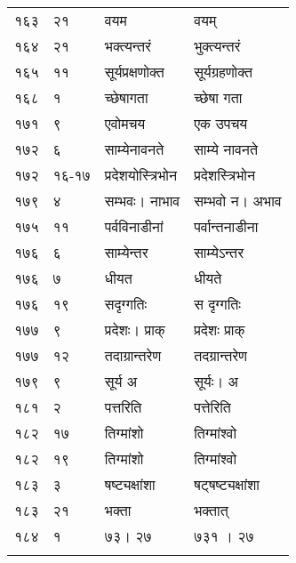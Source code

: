\documentclass[11pt, openany]{book}
\begin{document}
\begin{longtable}{p{1cm} p{1.5cm} p{4cm} p{4cm}}
 १६३ & २१ & वयम & वयम् \\

 १६४ & २१ & भक्त्यन्तरं & भुक्त्यन्तरं \\

 १६५ & ११ & सूर्यप्रक्षणोक्त & सूर्यग्रहणोक्त \\

 १६८ & १ & च्छेषागता & च्छेषा गता \\

 १७१ & ९ & एवोमचय & एक उपचय \\

 १७२ & ६ & साम्येनावनते & साम्ये नावनते \\

 १७२ & १६-१७ & प्रदेशयोस्त्रिभोन & प्रदेशस्त्रिभोन \\

 १७९ & ४ & सम्भवः। नाभाव & सम्भवो न। अभाव \\

 १७५ & ११ & पर्वविनाडीनां & पर्वान्तनाडीना \\

 १७६ & ६ & साम्येन्तर & साम्येऽन्तर \\

 १७६ & ७ & धीयत & धीयते \\

 १७६ & १९ & सदृग्गतिः & स दृग्गतिः \\

 १७७ & ९ & प्रदेशः। प्राक् & प्रदेशः प्राक् \\

 १७७ & १२ & तदाग्रान्तरेण & तदग्रान्तरेण \\

 १७९ & ९ & सूर्य अ &  सूर्यः। अ \\

 १८१ & २ & पत्तरिति & पत्तेरिति \\

 १८२ & १७ & तिग्मांशो & तिग्मांश्वो \\

 १८२ & १९ & तिग्मांशो & तिग्मांश्वो \\

 १८३ & ३ & षष्ट्यक्षांशा & षट्षष्ट्यक्षांशा \\

 १८३ & २१ & भक्ता & भक्तात् \\

 १८४ & १ & ७३। २७ & ७३१ । २७ \\



\newpage




\end{longtable}
\end{document}
